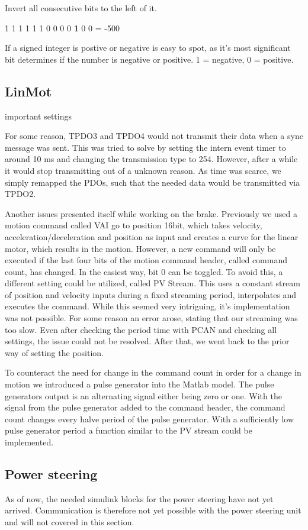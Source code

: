 Invert all consecutive bits to the left of it.

1 1 1 1  1 1 0  0 0 0  \textbf{1} 0 0 = -500

If a signed integer is postive or negative is easy to spot, as it's most significant bit determines if the number is negative or positive. 1 = negative, 0 = positive.

\subsection{LinMot}
important settings

For some reason, TPDO3 and TPDO4 would not transmit their data when a sync message was sent. This was tried to solve by setting the intern event timer to around 10 ms and changing the transmission type to 254. However, after a while it would stop transmitting out of a unknown reason. As time was scarce, we simply remapped the PDOs, such that the needed data would be transmitted via TPDO2. 


Another issues presented itself while working on the brake. Previously we used a motion command called VAI go to position 16bit, which takes velocity, acceleration/deceleration and position as input and creates a curve for the linear motor, which results in the motion. However, a new command will only be executed if the last four bits of the motion command header, called command count, has changed. In the easiest way, bit 0 can be toggled. 
To avoid this, a different setting could be utilized, called PV Stream. This uses a constant stream of position and velocity inputs during a fixed streaming period, interpolates and executes the command. While this seemed very intriguing, it's implementation was not possible. For some reason an error arose, stating that our streaming was too slow. Even after checking the period time with PCAN and checking all settings, the issue could not be resolved.
After that, we went back to the prior way of setting the position.

To counteract the need for change in the command count in order for a change in motion we introduced a pulse generator into the Matlab model.
The pulse generators output is an alternating signal either being zero or one. With the signal from the pulse generator added to the command header, the command count changes every halve period of the pulse generator. With a sufficiently low pulse generator period a function similar to the PV stream could be implemented.

\subsection{Power steering}

As of now, the needed simulink blocks for the power steering have not yet arrived. Communication is therefore not yet possible with the power steering unit and will not covered in this section.



